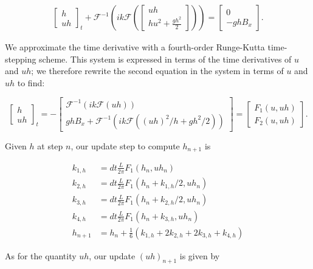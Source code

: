 \begin{align*}
    \begin{bmatrix}
        h\\
        uh
    \end{bmatrix}_t
    + 
    \mathcal{F}^{-1}\left(ik\mathcal{F}\left(\begin{bmatrix}
        uh\\
        hu^2 + \frac{gh^2}{2}
    \end{bmatrix} \right)\right)
    = 
    \begin{bmatrix}
        0\\
        -ghB_x
    \end{bmatrix}.
\end{align*}

We approximate the time derivative with a fourth-order Runge-Kutta time-stepping scheme. This system is expressed in 
terms of the time derivatives of $u$ and $uh$; we therefore rewrite the second equation in the system in 
terms of $u$ and $uh$ to find:

$$
\renewcommand*{\arraystretch}{1.5}
\begin{bmatrix}
    h\\
    uh
\end{bmatrix}_t = -\begin{bmatrix}
    \mathcal{F}^{-1}(ik\mathcal{F}(uh))\\
    ghB_x + \mathcal{F}^{-1}(ik\mathcal{F}((uh)^2/h + gh^2/2)) 
\end{bmatrix} = \begin{bmatrix}
    F_1(u,uh)\\
    F_2(u,uh)
\end{bmatrix}.
$$

\noindent Given $h$ at step $n$, our update step to compute $h_{n+1}$ is

\begin{align*}
    k_{1,h} &= dt\frac{L}{2\pi}F_1(h_n, uh_n)\\
    k_{2,h} &= dt\frac{L}{2\pi}F_1(h_n + k_{1,h}/2, uh_n)\\
    k_{3,h} &= dt\frac{L}{2\pi}F_1(h_n + k_{2,h}/2, uh_n)\\
    k_{4,h} &= dt\frac{L}{2\pi}F_1(h_n + k_{3,h}, uh_n)\\
    h_{n+1} &= h_n + \frac{1}{6}(k_{1,h} + 2k_{2,h} + 2k_{3,h} + k_{4,h})
\end{align*}

\noindent As for the quantity $uh$, our update $(uh)_{n+1}$ is given by

